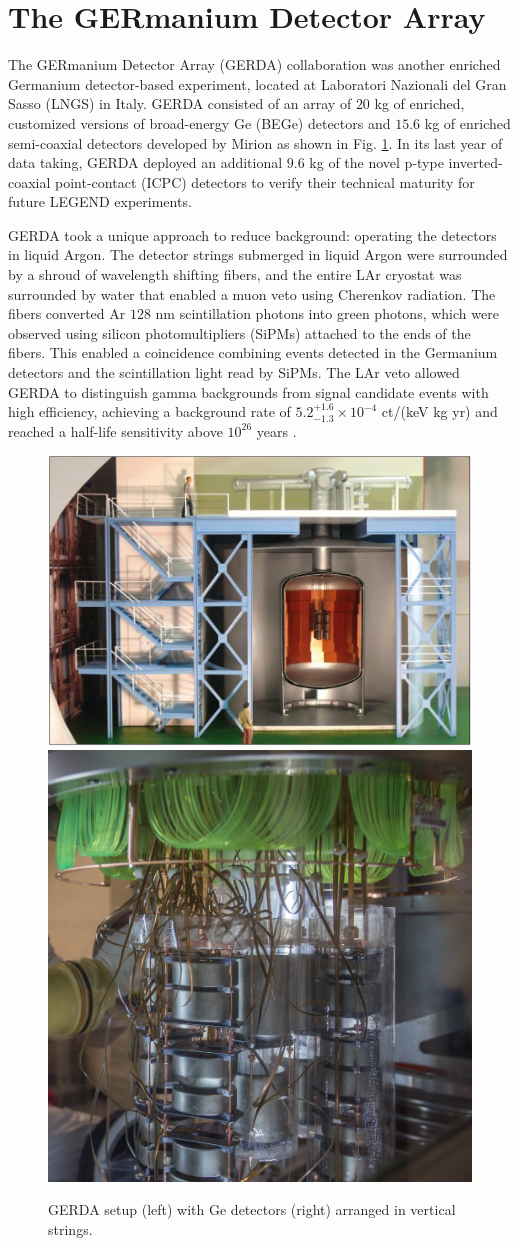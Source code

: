 \section{The GERmanium Detector Array}

The GERmanium Detector Array (GERDA) collaboration was another enriched Germanium detector-based experiment, located at Laboratori Nazionali del Gran Sasso (LNGS) in Italy. GERDA consisted of an array of $20$ kg of enriched, customized versions of broad-energy Ge (BEGe) detectors and $15.6$ kg of enriched semi-coaxial detectors developed by Mirion as shown in Fig. \ref{fig:gerda}. In its last year of data taking, GERDA deployed an additional $9.6$ kg of the novel p-type inverted-coaxial point-contact (ICPC) detectors to verify their technical maturity for future LEGEND experiments.

GERDA took a unique approach to reduce background: operating the detectors in liquid Argon. The detector strings submerged in liquid Argon were surrounded by a shroud of wavelength shifting fibers, and the entire LAr cryostat was surrounded by water that enabled a muon veto using Cherenkov radiation. The fibers converted Ar $128$ nm scintillation photons into green photons, which were observed using silicon photomultipliers (SiPMs) attached to the ends of the fibers. This enabled a coincidence combining events detected in the Germanium detectors and the scintillation light read by SiPMs. The LAr veto allowed GERDA to distinguish gamma backgrounds from {\onbb} signal candidate events with high efficiency, achieving a background rate of $5.2^{+1.6}_{-1.3}\times 10^{-4}$ ct/(keV kg yr) and reached a half-life sensitivity above $10^{26}$ years \cite{GERDA_final}.

\begin{figure}
\centering
\includegraphics[height=0.35\columnwidth]{ch2/figs/gerda_setup.png}
\qquad
\includegraphics[height=0.35\columnwidth]{ch2/figs/gerdastrings.jpeg}
\caption{GERDA setup (left) with Ge detectors (right) arranged in vertical strings.}
\label{fig:gerda}
\end{figure}
  
